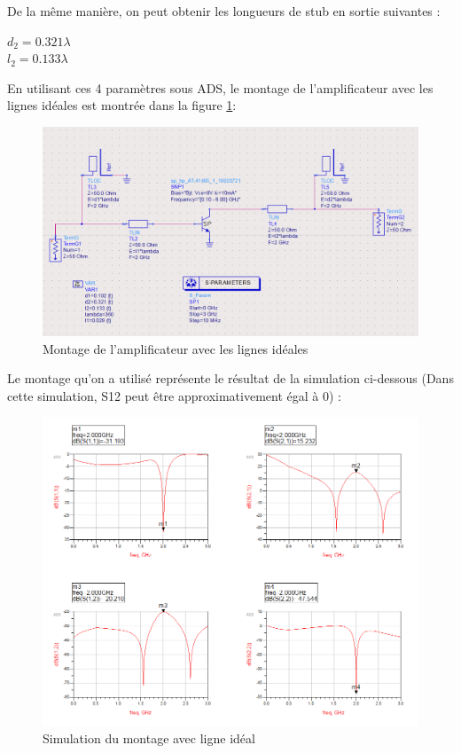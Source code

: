 \documentclass[french]{article}
\begin{document}
De la même manière, on peut obtenir les longueurs de stub en sortie suivantes :
 
{\centering
	$d_{2}=0.321\lambda$\\
	$l_{2}=0.133\lambda$\\
}

En utilisant ces 4 paramètres sous ADS, le montage de l’amplificateur avec les lignes idéales est montrée dans la figure \ref{fig:ligne_ideal}:
\begin{figure}[H]
	\centering
	\includegraphics[width=0.7\linewidth]{../5SynthAmp/ligne_ideal}
	\caption{Montage de l’amplificateur avec les lignes idéales}
	\label{fig:ligne_ideal}
\end{figure}

Le montage qu’on a utilisé représente le résultat de la simulation ci-dessous (Dans cette simulation, S12 peut être approximativement égal à 0) :
\begin{figure}[H]
	\centering
	\includegraphics[width=1\linewidth]{../5SynthAmp/ligne_ideal_Sparametres}
	\caption{Simulation du montage avec ligne idéal}
	\label{fig:ligne_ideal_Sparametres}
\end{figure}
\end{document}
